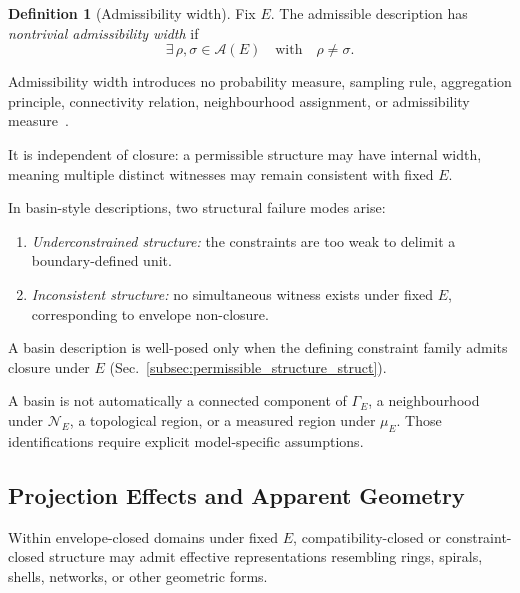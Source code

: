 \documentclass[aps,prx,onecolumn,11pt]{revtex4-2}
\theoremstyle{plain}
\theoremstyle{definition}
\newtheorem{definition}{Definition}
\theoremstyle{remark}
\begin{document}
\begin{definition}[Admissibility width]
\label{def:admissibility_width}
Fix \(E\). The admissible description has \emph{nontrivial
admissibility width} if
\begin{equation}
\exists\,\rho,\sigma\in\mathcal A(E)
\quad\text{with}\quad
\rho\neq\sigma.
\label{eq:admissibility_width_nontrivial}
\end{equation}
\end{definition}

Admissibility width introduces no probability measure, sampling rule,
aggregation principle, connectivity relation, neighbourhood assignment,
or admissibility measure~\cite{NielsenChuang2010,Watrous2018}.

It is independent of closure: a permissible structure may have internal
width, meaning multiple distinct witnesses may remain consistent with
fixed \(E\).

In basin-style descriptions, two structural failure modes arise:

\begin{enumerate}[label=(\roman*), leftmargin=2.2em]

\item \emph{Underconstrained structure:} the constraints are too weak to
delimit a boundary-defined unit.

\item \emph{Inconsistent structure:} no simultaneous witness exists
under fixed \(E\), corresponding to envelope non-closure.

\end{enumerate}

A basin description is well-posed only when the defining constraint
family admits closure under \(E\)
(Sec.~\ref{subsec:permissible_structure_struct}).

A basin is not automatically a connected component of \(\Gamma_E\), a
neighbourhood under \(\mathcal N_E\), a topological region, or a
measured region under \(\mu_E\). Those identifications require explicit
model-specific assumptions.

\subsection{Projection Effects and Apparent Geometry}
\label{subsec:projection_effects_geometry_struct}

Within envelope-closed domains under fixed \(E\), compatibility-closed
or constraint-closed structure may admit effective representations
resembling rings, spirals, shells, networks, or other geometric forms.
\end{document}
